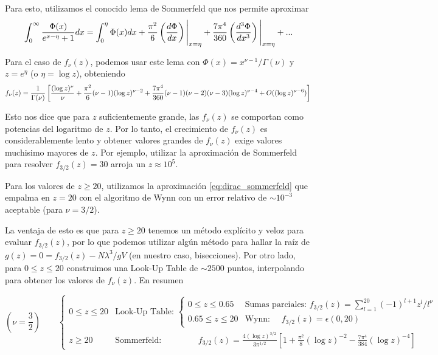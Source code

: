 Para esto, utilizamos el conocido lema de Sommerfeld que nos permite aproximar
\begin{equation}{\label{eq:sommerfeld}}
 \int_0^\infty \frac{\Phi(x)}{e^{x-\eta}+1}dx = \int_0^\eta \Phi(x) dx + \frac{\pi^2}{6}\left( \frac{d\Phi}{dx} \right)\Bigg|_{x=\eta} +
 \frac{7\pi^4}{360}\left( \frac{d^3\Phi}{dx^3} \right)\Bigg|_{x=\eta} + ...
\end{equation}

Para el caso de $f_\nu(z)$, podemos usar este lema con $\Phi(x) = x^{\nu-1}/\Gamma(\nu)$ y $z = e^{\eta}$ (o $\eta = \log z$), obteniendo
\begin{equation}{\label{eq:dirac_sommerfeld}}
f_\nu(z) = \frac{1}{\Gamma(\nu)}\left[ \frac{(\log z)^\nu}{\nu} + \frac{\pi^2}{6}(\nu - 1)(\log z)^{\nu-2} + \frac{7\pi^4}{360}(\nu - 1)(\nu - 2)(\nu - 3)(\log z)^{\nu - 4}
+ O((\log z)^{\nu-6})  \right]
\end{equation}

Esto nos dice que para $z$ suficientemente grande, las $f_\nu(z)$ se comportan como potencias del logaritmo de $z$.
Por lo tanto, el crecimiento de $f_\nu(z)$ es considerablemente lento y obtener valores grandes de $f_\nu(z)$ exige valores muchisimo mayores de $z$.
Por ejemplo, utilizar la aproximación de Sommerfeld para resolver $f_{3/2}(z) = 30$ arroja un $z\approx 10^5$.

Para los valores de $z\geq 20$, utilizamos la aproximación \eqref{eq:dirac_sommerfeld} que empalma en $z=20$ con el algoritmo de Wynn con un error relativo de
$\sim10^{-3}$ aceptable (para $\nu=3/2$).

La ventaja de esto es que para $z\geq 20$ tenemos un método explícito y veloz para evaluar $f_{3/2}(z)$, por lo que podemos utilizar algún método para hallar la
raíz de $g(z) = 0 = f_{3/2}(z) - N\lambda^3/gV$ (en nuestro caso, bisecciones).
Por otro lado, para $0\leq z\leq 20$ construimos una Look-Up Table de $\sim 2500$ puntos, interpolando para obtener los valores de $f_\nu(z)$.
En resumen

\[  \left(\nu = \frac{3}{2}\right) \qquad
 \left\{\begin{matrix}
  0 \leq z \leq 20 & \text{Look-Up Table: } \left\{\begin{matrix}
		    0 \leq z \leq 0.65 & \text{Sumas parciales: } f_{3/2}(z) = \sum_{l=1}^{20} (-1)^{l+1} z^l/l^\nu \\
		    0.65 \leq z \leq 20 & \text{Wynn: } \quad f_{3/2}(z) = \epsilon(0,20)
		    \end{matrix}\right. \\
 z\geq 20 & \text{Sommerfeld: } \qquad \qquad f_{3/2}(z) = \frac{4(\log z)^{3/2}}{3\pi^{1/2}}\left[ 1 + \frac{\pi^2}{8}(\log z)^{-2} - \frac{7\pi^4}{384}(\log z)^{-4}  \right]
 \end{matrix} \right.
\]

